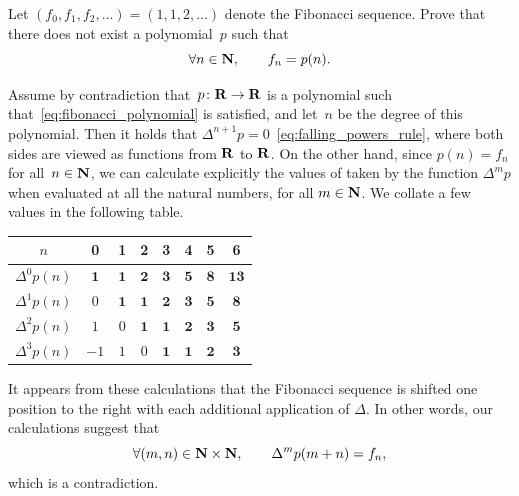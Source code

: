 \begin{exercise}
    Let $(f_0, f_1, f_2, \dotsc) = (1, 1, 2, \dotsc)$ denote the Fibonacci sequence.
    Prove that there does not exist a polynomial~$p$ such that
    \begin{equation}
        \label{eq:fibonacci_polynomial}
        \forall n \in \mathbf N, \qquad
        f_n = p(n).
    \end{equation}
\end{exercise}
\begin{solution}
    Assume by contradiction that~$p\colon \mathbf R \to \mathbf R$ is a polynomial such that~\eqref{eq:fibonacci_polynomial} is satisfied,
    and let~$n$ be the degree of this polynomial.
    Then it holds that $\Delta^{n+1} p = 0$~\eqref{eq:falling_powers_rule},
    where both sides are viewed as functions from $\mathbf R$ to $\mathbf R$.
    On the other hand,
    since $p(n) = f_n$ for all~$n\in \mathbf N$,
    we can calculate explicitly the values of taken by the function $\Delta^{m} p$ when evaluated at all the natural numbers,
    for all $m \in \mathbf N$.
    We collate a few values in the following table.
    \begin{center}
    \begin{tabular}{|c|c|c|c|c|c|c|c|}
        \hline
        $n$    & 0 & 1 & 2 & 3 & 4 & 5 & 6 \\ \hline
        $\Delta^0 p(n)$ & $\mathbf{1}$ & $\mathbf{1}$ & $\mathbf{2}$ & $\mathbf{3}$ & $\mathbf{5}$ & $\mathbf{8}$ & $\mathbf{13}$ \\ \hline
        $\Delta^1 p(n)$ & $0$ & $\mathbf{1}$ & $\mathbf{1}$ & $\mathbf{2}$ & $\mathbf{3}$ & $\mathbf{5}$ & $\mathbf{8}$ \\ \hline
        $\Delta^2 p(n)$ & $1$ & $0$ & $\mathbf{1}$ & $\mathbf{1}$ & $\mathbf{2}$ & $\mathbf{3}$ & $\mathbf{5}$ \\ \hline
        $\Delta^3 p(n)$ & $-1$ & $1$ & $0$ & $\mathbf{1}$ & $\mathbf{1}$ & $\mathbf{2}$ & $\mathbf{3}$ \\ \hline
    \end{tabular}
    \end{center}
    It appears from these calculations that the Fibonacci sequence is shifted one position to the right with each additional application of $\Delta$.
    In other words, our calculations suggest that
    \begin{equation}
        \label{eq:difference_fib}
        \forall (m, n) \in \mathbf N \times \mathbf N,
        \qquad \Delta^m p(m+n) = f_n,
    \end{equation}
    which is a contradiction.

\end{solution}
